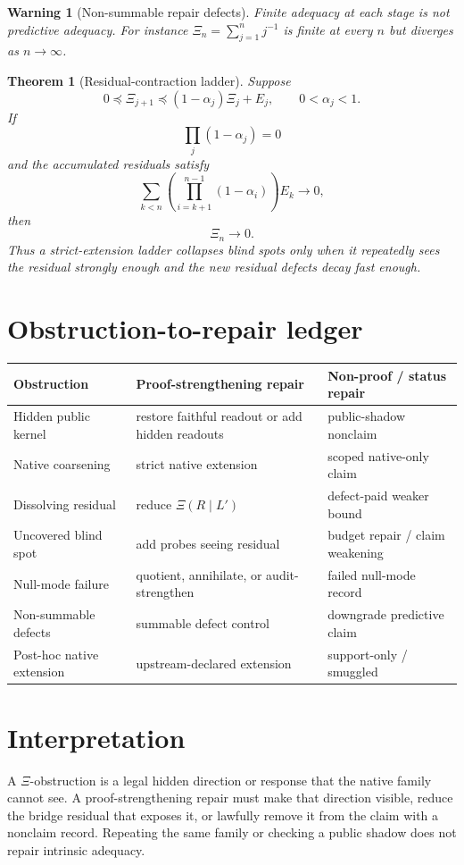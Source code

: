 \documentclass[11pt]{article}
\newtheorem{theorem}{Theorem}
\newtheorem{warning}{Warning}
\begin{document}
\begin{warning}[Non-summable repair defects]
Finite adequacy at each stage is not predictive adequacy.  For instance $\Xi_n=\sum_{j=1}^n j^{-1}$ is finite at every $n$ but diverges as $n\to\infty$.
\end{warning}

\begin{theorem}[Residual-contraction ladder]
Suppose
\[
0\preceq \Xi_{j+1}\preceq (1-\alpha_j)\Xi_j+E_j,
\qquad 0<\alpha_j<1.
\]
If
\[
\prod_j(1-\alpha_j)=0
\]
and the accumulated residuals satisfy
\[
\sum_{k< n}\left(\prod_{i=k+1}^{n-1}(1-\alpha_i)\right)E_k\to0,
\]
then
\[
\Xi_n\to0.
\]
Thus a strict-extension ladder collapses blind spots only when it repeatedly sees the residual strongly enough and the new residual defects decay fast enough.
\end{theorem}

\section{Obstruction-to-repair ledger}
\begin{center}
\begin{tabular}{lll}
\toprule
Obstruction & Proof-strengthening repair & Non-proof / status repair\\
\midrule
Hidden public kernel & restore faithful readout or add hidden readouts & public-shadow nonclaim\\
Native coarsening & strict native extension & scoped native-only claim\\
Dissolving residual & reduce $\Xi(R\mid L')$ & defect-paid weaker bound\\
Uncovered blind spot & add probes seeing residual & budget repair / claim weakening\\
Null-mode failure & quotient, annihilate, or audit-strengthen & failed null-mode record\\
Non-summable defects & summable defect control & downgrade predictive claim\\
Post-hoc native extension & upstream-declared extension & support-only / smuggled\\
\bottomrule
\end{tabular}
\end{center}

\section{Interpretation}
A $\Xi$-obstruction is a legal hidden direction or response that the native family cannot see.  A proof-strengthening repair must make that direction visible, reduce the bridge residual that exposes it, or lawfully remove it from the claim with a nonclaim record.  Repeating the same family or checking a public shadow does not repair intrinsic adequacy.
\end{document}
